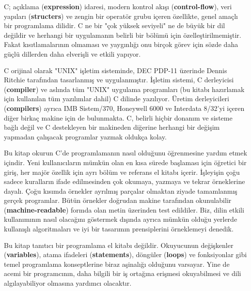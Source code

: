 \documentclass[a4paper,12pt,oneside]{book}
\begin{document}
C; açıklama (\textbf{expression}) idaresi, modern kontrol akışı (\textbf{control-flow}), veri yapıları (\textbf{structers}) ve zengin bir operatör grubu içeren özellikte, genel amaçlı bir programlama dilidir. C ne bir "çok yüksek seviyeli" ne de büyük bir dil değildir ve herhangi bir uygulamanın belirli bir bölümü için özelleştirilmemiştir. Fakat kısıtlamalarının olmaması ve yaygınlığı onu birçok görev için sözde daha güçlü dillerden daha elverişli ve etkili yapıyor.
\par C orijinal olarak "UNIX" işletim sisteminde, DEC PDP-11 üzerinde Dennis Ritchie tarafından tasarlanmış ve uygulanmıştır. İşletim sistemi, C derleyicisi (\textbf{compiler}) ve aslında tüm "UNIX" uygulama programları (bu kitabı hazırlamak için kullanılan tüm yazılımlar dahil) C dilinde yazılıyor. Üretim derleyicileri (\textbf{compilers}) ayrıca IMB Sistem/370, Honeywell 6000 ve Interdata 8/32'yi içeren diğer birkaç makine için de bulunmakta. C, belirli hiçbir donanım ve sisteme bağlı değil ve C destekleyen bir makineden diğerine herhangi bir değişim yapmadan çalışacak programlar yazmak oldukça kolay.
\par Bu kitap okurun C'de programlamanın nasıl olduğunu öğrenmesine yardım etmek içindir. Yeni kullanıcıların mümkün olan en kısa sürede başlaması için öğretici bir giriş, her majör özellik için ayrı bölüm ve referans el kitabı içerir. İşleyişin çoğu sadece kuralların ifade edilmesinden çok okumaya, yazmaya ve tekrar örneklerine dayalı. Çoğu kısımda örnekler ayrılmış parçalar olmaktan ziyade tamamlanmış gerçek programlar. Bütün örnekler doğrudan makine tarafından okunulabilir (\textbf{machine-readable}) formda olan metin üzerinden test edildiler. Biz, dilin etkili kullanımının nasıl olacağını göstermek dışında ayrıca mümkün olduğu yerlerde kullanışlı algoritmaları ve iyi bir tasarımın prensiplerini örneklemeyi denedik.
\par Bu kitap tanıtıcı bir programlama el kitabı değildir. Okuyucunun değişkenler (\textbf{variables}), atama ifadeleri (\textbf{statements}), döngüler (\textbf{loops}) ve fonksiyonlar  gibi temel programlama konseptlerine biraz aşinalığı olduğunu varsayar. Yine de acemi bir programcının, daha bilgili bir iş ortağına erişmesi okuyabilmesi ve dili algılayabiliyor olmasına yardımcı olacaktır. \pagebreak
\end{document}
